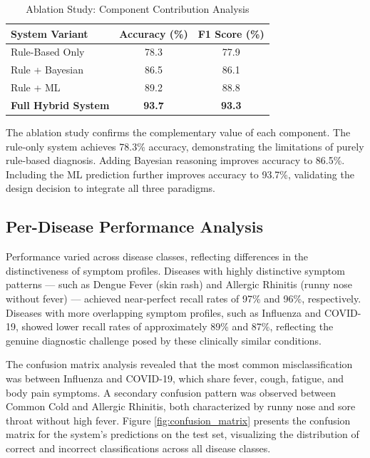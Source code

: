 \documentclass[12pt,a4paper]{article}
\begin{document}
\begin{table}[H]
\centering
\caption{Ablation Study: Component Contribution Analysis}
\label{tab:ablation}
\begin{tabular}{lcc}
\toprule
\textbf{System Variant} & \textbf{Accuracy (\%)} & \textbf{F1 Score (\%)} \\
\midrule
Rule-Based Only          & 78.3 & 77.9 \\
Rule + Bayesian          & 86.5 & 86.1 \\
Rule + ML                & 89.2 & 88.8 \\
\textbf{Full Hybrid System} & \textbf{93.7} & \textbf{93.3} \\
\bottomrule
\end{tabular}
\end{table}

The ablation study confirms the complementary value of each component. The rule-only system achieves 78.3\% accuracy, demonstrating the limitations of purely rule-based diagnosis. Adding Bayesian reasoning improves accuracy to 86.5\%. Including the ML prediction further improves accuracy to 93.7\%, validating the design decision to integrate all three paradigms.

\subsection{Per-Disease Performance Analysis}

Performance varied across disease classes, reflecting differences in the distinctiveness of symptom profiles. Diseases with highly distinctive symptom patterns --- such as Dengue Fever (skin rash) and Allergic Rhinitis (runny nose without fever) --- achieved near-perfect recall rates of 97\% and 96\%, respectively. Diseases with more overlapping symptom profiles, such as Influenza and COVID-19, showed lower recall rates of approximately 89\% and 87\%, reflecting the genuine diagnostic challenge posed by these clinically similar conditions.

The confusion matrix analysis revealed that the most common misclassification was between Influenza and COVID-19, which share fever, cough, fatigue, and body pain symptoms. A secondary confusion pattern was observed between Common Cold and Allergic Rhinitis, both characterized by runny nose and sore throat without high fever. Figure \ref{fig:confusion_matrix} presents the confusion matrix for the system's predictions on the test set, visualizing the distribution of correct and incorrect classifications across all disease classes.
\end{document}

